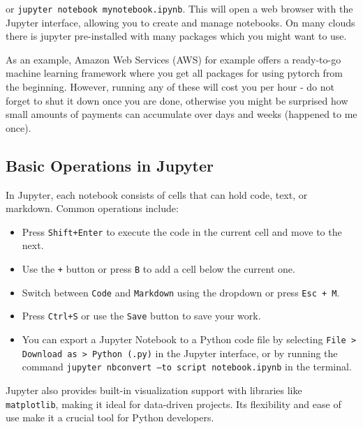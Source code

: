 or \texttt{jupyter notebook mynotebook.ipynb}. This will open a web browser with the Jupyter interface, allowing you to create and manage notebooks. On many clouds there is jupyter pre-installed with many packages which you might want to use. 

As an example, Amazon Web Services (AWS) for example offers a ready-to-go machine learning framework where you get all packages for using pytorch from the beginning. However, running any of these will cost you per hour - do not forget to shut it down once you are done, otherwise you might be surprised how small amounts of payments can accumulate over days and weeks (happened to me once). 

%
\subsection{Basic Operations in Jupyter}

In Jupyter, each notebook consists of cells that can hold code, text, or markdown. Common operations include:

\begin{itemize}
    \item {} Press \texttt{Shift+Enter} to execute the code in the current cell and move to the next.
    \item {} Use the \texttt{+} button or press \texttt{B} to add a cell below the current one.
    \item {} Switch between \texttt{Code} and \texttt{Markdown} using the dropdown or press \texttt{Esc + M}.
    \item {} Press \texttt{Ctrl+S} or use the \texttt{Save} button to save your work.
		\item {} You can export a Jupyter Notebook to a Python code file by selecting \texttt{File > Download as > Python (.py)} in the Jupyter interface, or by running the command \texttt{jupyter nbconvert --to script notebook.ipynb} in the terminal.
\end{itemize}

Jupyter also provides built-in visualization support with libraries like \texttt{matplotlib}, making it ideal for data-driven projects. Its flexibility and ease of use make it a crucial tool for Python developers.

